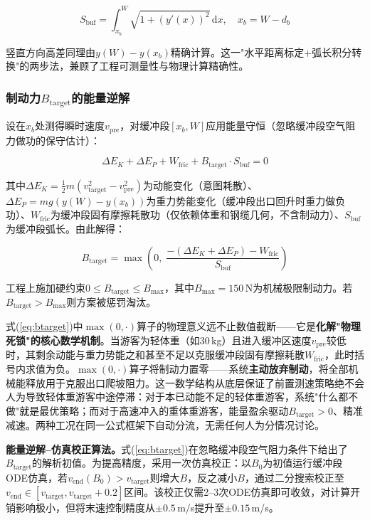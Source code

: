 \documentclass[12pt,a4paper]{ctexart}
\begin{document}
\begin{equation}
  S_{\text{buf}} = \int_{x_b}^{W} \sqrt{1 + (y'(x))^2}\,\mathrm{d}x, \quad x_b = W - d_b
  \label{eq:arc_length_convert}
\end{equation}

竖直方向高差同理由$y(W) - y(x_b)$精确计算。这一"水平距离标定$+$弧长积分转换"的两步法，兼顾了工程可测量性与物理计算精确性。

\subsubsection{制动力$B_{\text{target}}$的能量逆解}

设在$x_b$处测得瞬时速度$v_{\text{pre}}$，对缓冲段$[x_b, W]$应用能量守恒（忽略缓冲段空气阻力做功的保守估计）：

\begin{equation}
  \Delta E_K + \Delta E_P + W_{\text{fric}} + B_{\text{target}} \cdot S_{\text{buf}} = 0
  \label{eq:energy_balance}
\end{equation}

其中$\Delta E_K = \frac{1}{2}m(v_{\text{target}}^2 - v_{\text{pre}}^2)$为动能变化（意图耗散）、$\Delta E_P = mg(y(W) - y(x_b))$为重力势能变化（缓冲段出口回升时重力做负功）、$W_{\text{fric}}$为缓冲段固有摩擦耗散功（仅依赖体重和钢缆几何，不含制动力）、$S_{\text{buf}}$为缓冲段弧长。由此解得：

\begin{equation}
  B_{\text{target}} = \max\left(0,\; \frac{-(\Delta E_K + \Delta E_P) - W_{\text{fric}}}{S_{\text{buf}}}\right)
  \label{eq:btarget}
\end{equation}

工程上施加硬约束$0 \leq B_{\text{target}} \leq B_{\max}$，其中$B_{\max}=150$\,N为机械极限制动力。若$B_{\text{target}} > B_{\max}$则方案被惩罚淘汰。

式(\ref{eq:btarget})中$\max(0,\cdot)$算子的物理意义远不止数值截断——它是\textbf{化解"物理死锁"的核心数学机制}。当游客为轻体重（如30\,kg）且进入缓冲区速度$v_{\text{pre}}$较低时，其剩余动能与重力势能之和甚至不足以克服缓冲段固有摩擦耗散$W_{\text{fric}}$，此时括号内求值为负。$\max(0,\cdot)$算子将制动力置零——系统\textbf{主动放弃制动}，将全部机械能释放用于克服出口爬坡阻力。这一数学结构从底层保证了前置测速策略绝不会人为导致轻体重游客中途停滞：对于本已动能不足的轻体重游客，系统"什么都不做"就是最优策略；而对于高速冲入的重体重游客，能量盈余驱动$B_{\text{target}}>0$、精准减速。两种工况在同一公式框架下自动分流，无需任何人为分情况讨论。

\textbf{能量逆解--仿真校正算法。}式(\ref{eq:btarget})在忽略缓冲段空气阻力条件下给出了$B_{\text{target}}$的解析初值。为提高精度，采用一次仿真校正：以$B_0$为初值运行缓冲段ODE仿真，若$v_{\text{end}}(B_0) > v_{\text{target}}$则增大$B$，反之减小$B$，通过二分搜索校正至$v_{\text{end}}\in[v_{\text{target}}, v_{\text{target}}+0.2]$区间。该校正仅需2--3次ODE仿真即可收敛，对计算开销影响极小，但将末速控制精度从$\pm0.5$\,m/s提升至$\pm0.15$\,m/s。
\end{document}
